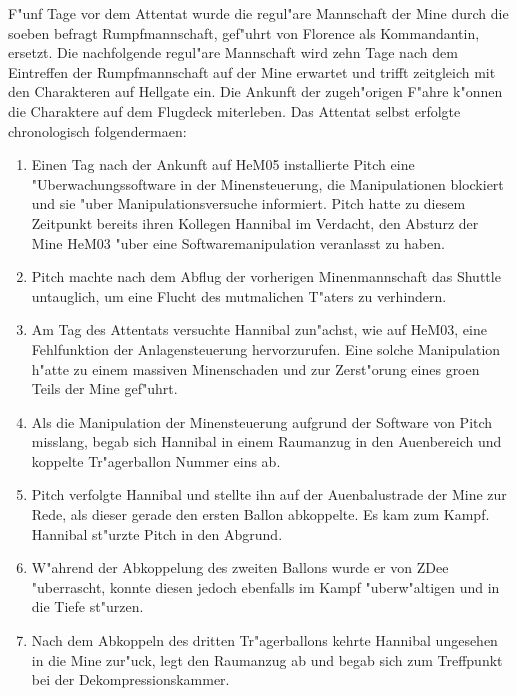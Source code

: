 
F"unf Tage vor dem Attentat wurde die regul"are Mannschaft der Mine durch die soeben befragt Rumpfmannschaft, gef"uhrt von Florence als Kommandantin, ersetzt. Die nachfolgende regul"are Mannschaft wird zehn Tage nach dem Eintreffen der Rumpfmannschaft auf der Mine erwartet und trifft zeitgleich mit den Charakteren auf Hellgate ein. Die Ankunft der zugeh"origen F"ahre k"onnen die Charaktere auf dem Flugdeck miterleben. Das Attentat selbst erfolgte chronologisch folgenderma\3en:
 
\begin{enumerate}
	\item Einen Tag nach der Ankunft auf HeM05 installierte Pitch eine "Uberwachungssoftware in der Minensteuerung, die Manipulationen 
		blockiert und sie "uber Manipulationsversuche informiert. Pitch hatte zu diesem Zeitpunkt bereits ihren Kollegen Hannibal im Verdacht, den Absturz der Mine HeM03 "uber eine Softwaremanipulation veranlasst zu haben.
	\item Pitch machte nach dem Abflug der vorherigen Minenmannschaft das Shuttle untauglich, um eine Flucht des mutma\3lichen T"aters zu 
		verhindern.
	\item Am Tag des Attentats versuchte Hannibal zun"achst, wie auf HeM03, eine Fehlfunktion der Anlagensteuerung hervorzurufen. Eine 
		solche Manipulation h"atte zu einem massiven Minenschaden und zur Zerst"orung eines gro\3en Teils der Mine gef"uhrt.
	\item Als die Manipulation der Minensteuerung aufgrund der Software von Pitch misslang, begab sich Hannibal in einem Raumanzug in den 
		Au\3enbereich und koppelte Tr"agerballon Nummer eins ab.
	\item Pitch verfolgte Hannibal und stellte ihn auf der Au\3enbalustrade der Mine zur Rede, als dieser gerade den ersten Ballon 
		abkoppelte. Es kam zum Kampf. Hannibal st"urzte Pitch in den Abgrund. 
	\item W"ahrend der Abkoppelung des zweiten Ballons wurde er von ZDee "uberrascht, konnte diesen jedoch ebenfalls im Kampf 
		"uberw"altigen und in die Tiefe st"urzen.
	\item Nach dem Abkoppeln des dritten Tr"agerballons kehrte Hannibal ungesehen in die Mine zur"uck, legt den Raumanzug ab und begab sich 
		zum Treffpunkt bei der Dekompressionskammer. 
\end{enumerate}

